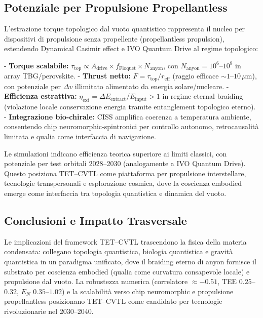\documentclass[11pt,a4paper]{article}
\theoremstyle{plain}
\theoremstyle{definition}
\begin{document}
\subsection{Potenziale per Propulsione Propellantless}

L'estrazione torque topologico dal vuoto quantistico rappresenta il nucleo per dispositivi di propulsione senza propellente (propellantless propulsion), estendendo Dynamical Casimir effect e IVO Quantum Drive al regime topologico:

- \textbf{Torque scalabile:} $\tau_{\mathrm{top}} \propto A_{\mathrm{drive}} \times f_{\mathrm{Floquet}} \times N_{\mathrm{anyon}}$, con $N_{\mathrm{anyon}} = 10^6$--$10^8$ in array TBG/perovskite.
- \textbf{Thrust netto:} $F = \tau_{\mathrm{top}} / r_{\mathrm{eff}}$ (raggio efficace $\sim 1$--$10\,\mu\mathrm{m}$), con potenziale per $\Delta v$ illimitato alimentato da energia solare/nucleare.
- \textbf{Efficienza estrattiva:} $\eta_{\mathrm{ext}} = \Delta E_{\mathrm{extract}} / E_{\mathrm{input}} > 1$ in regime eternal braiding (violazione locale conservazione energia tramite entanglement topologico eterno).
- \textbf{Integrazione bio-chirale:} CISS amplifica coerenza a temperatura ambiente, consentendo chip neuromorphic-spintronici per controllo autonomo, retrocausalità limitata e qualia come interfaccia di navigazione.

Le simulazioni indicano efficienza teorica superiore ai limiti classici, con potenziale per test orbitali 2028--2030 (analogamente a IVO Quantum Drive). Questo posiziona TET--CVTL come piattaforma per propulsione interstellare, tecnologie transpersonali e esplorazione cosmica, dove la coscienza embodied emerge come interfaccia tra topologia quantistica e dinamica del vuoto.

\vspace{0.3cm}

\subsection{Conclusioni e Impatto Trasversale}

Le implicazioni del framework TET--CVTL trascendono la fisica della materia condensata: collegano topologia quantistica, biologia quantistica e gravità quantistica in un paradigma unificato, dove il braiding eterno di anyon fornisce il substrato per coscienza embodied (qualia come curvatura consapevole locale) e propulsione dal vuoto. La robustezza numerica (correlatore $\approx -0.51$, TEE $0.25$--$0.32$, $E_N$ $0.35$--$1.02$) e la scalabilità verso chip neuromorphic e propulsione propellantless posizionano TET--CVTL come candidato per tecnologie rivoluzionarie nel 2030--2040.
\end{document}
